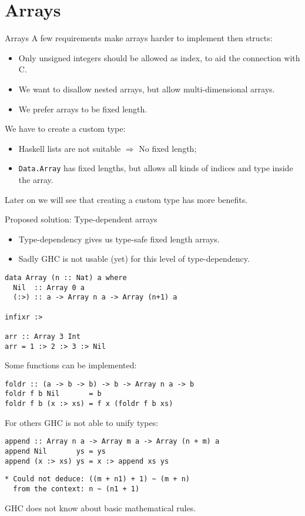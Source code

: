 \documentclass{beamer}
\begin{document}
\section{Arrays}
\begin{frame}{Arrays}
A few requirements make arrays harder to implement then structs:
\begin{itemize}
  \item Only unsigned integers should be allowed as index, to aid the
  connection with C.
  \item We want to disallow nested arrays, but allow multi-dimensional arrays.
  \item We prefer arrays to be fixed length.
\end{itemize}

We have to create a custom type:
\begin{itemize}
  \item Haskell lists are not suitable $\Rightarrow$ No fixed length;
  \item \texttt{Data.Array} has fixed lengths, but allows all kinds of indices
  and type inside the array.
\end{itemize}

Later on we will see that creating a custom type has more benefits.
\end{frame}


\begin{frame}[fragile]{Proposed solution: Type-dependent arrays}
\begin{itemize}
  \item Type-dependency gives us type-safe fixed length arrays.
  \item Sadly GHC is not usable (yet) for this level of type-dependency.
\end{itemize}
\begin{lstlisting}
data Array (n :: Nat) a where
  Nil  :: Array 0 a
  (:>) :: a -> Array n a -> Array (n+1) a

infixr :>

arr :: Array 3 Int
arr = 1 :> 2 :> 3 :> Nil
\end{lstlisting}
\end{frame}

\begin{frame}[fragile]
Some functions can be implemented:
\begin{lstlisting}[basicstyle=\small]
foldr :: (a -> b -> b) -> b -> Array n a -> b
foldr f b Nil       = b
foldr f b (x :> xs) = f x (foldr f b xs)
\end{lstlisting}
For others GHC is not able to unify types:
\begin{lstlisting}[basicstyle=\small]
append :: Array n a -> Array m a -> Array (n + m) a
append Nil       ys = ys
append (x :> xs) ys = x :> append xs ys
\end{lstlisting}
\begin{lstlisting}[basicstyle=\small,language={}]
* Could not deduce: ((m + n1) + 1) ~ (m + n)
  from the context: n ~ (n1 + 1)
\end{lstlisting}
GHC does not know about basic mathematical rules.
\end{frame}
\end{document}
